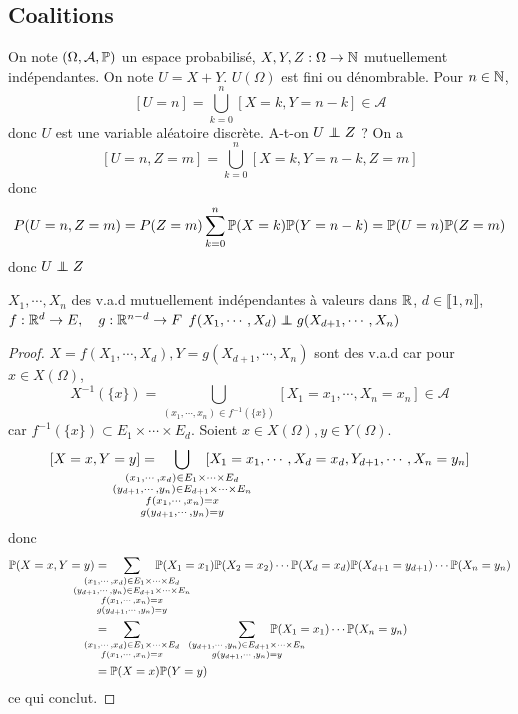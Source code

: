 \subsection{Coalitions}

On note $(\Omega, \mathcal A, \P)$ un espace probabilisé, $X, Y, Z: \Omega \to  \N$ mutuellement indépendantes. On note $U=X+Y$.  $U(\Omega)$ est fini ou dénombrable. Pour  $n\in  \N$, \[
    [U=n]=\bigcup_{k=0}^{n}[X=k,Y=n-k]\in \mathcal A
\] 
donc $U$ est une variable aléatoire discrète. A-t-on  $U\indep Z$ ? On a  \[
    [U=n,Z=m]=\bigcup_{k=0}^{n}[X=k,Y=n-k,Z=m]
\]
donc \[
    P(U=n,Z=m)=P(Z=m) \sum_{k=0}^{n} \P(X=k)\P(Y=n-k)=\P(U=n)\P(Z=m)
\]
donc $U\indep Z$

\begin{lmm}
    \Hyp $X_1,\cdots, X_n$ des v.a.d mutuellement indépendantes à valeurs dans $\R$, $d\in \llbracket 1, n\rrbracket$, $f: \R^d\to  E,\quad g: \R^{n-d}\to F$
    \Conc $f(X_1,\cdots, X_d)\indep g(X_{d+1},\cdots ,X_n)$
\end{lmm}

\begin{proof}
    $X=f(X_1,\cdots ,X_d),Y=g(X_{d+1},\cdots ,X_n)$ sont des v.a.d car pour $x\in X(\Omega)$, \[
        X^{-1}(\{x\} )=\bigcup_{(x_1,\cdots ,x_n)\in f^{-1}(\{x\} )} [X_1=x_1,\cdots ,X_n=x_n]\in \mathcal A
    \] car $f^{-1}(\{x\} )\subset E_1\times \cdots \times E_d$. Soient $x\in X(\Omega),y\in Y(\Omega)$. \[
    [X=x,Y=y]=\;\;\;\;\smashoperator{\bigcup_{\substack{(x_1,\cdots ,x_d)\in E_1\times \cdots \times E_d\\(y_{d+1},\cdots ,y_n)\in E_{d+1}\times \cdots \times E_n\\ f(x_1,\cdots ,x_n)=x\\g(y_{d+1},\cdots ,y_n)=y}}} \;\;\;\;[X_1=x_1,\cdots ,X_d=x_d,Y_{d+1},\cdots ,X_n=y_n]
\] donc \begin{align*}
\P(X=x,Y=y)&=\;\;\;\;\smashoperator[lr]{\sum_{\substack{(x_1,\cdots ,x_d)\in E_1\times \cdots \times E_d\\(y_{d+1},\cdots ,y_n)\in E_{d+1}\times \cdots \times E_n\\ f(x_1,\cdots ,x_n)=x\\g(y_{d+1},\cdots ,y_n)=y}}}\;\;\;\; \P(X_1=x_1)\P(X_2=x_2)\cdots \P(X_d=x_d)\P(X_{d+1}=y_{d+1})\cdots \P(X_n=y_n) \\
           &= \;\;\;\;\smashoperator[l]{\sum_{\substack{(x_1,\cdots ,x_d)\in E_1\times \cdots \times E_d\\ f(x_1,\cdots ,x_n)=x}}}\;\;
           \smashoperator[r]{\sum_{\substack{(y_{d+1},\cdots ,y_n)\in E_{d+1}\times \cdots \times E_n\\ g(y_{d+1},\cdots ,y_n)=y}}}\;\;\;\; \P(X_1=x_1)\cdots \P(X_n=y_n) \\
           &= \P(X=x)\P(Y=y)
\end{align*}
ce qui conclut.
\end{proof}

